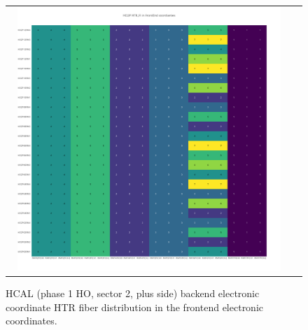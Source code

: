 \begin{figure}[htb]
 \begin{center}
  \begin{tabular}{cc}
   \includegraphics[angle=0,width=0.95\textwidth]{figures/appendix/HO2P_HTR_FI_in_FrontEnd.png}
  \end{tabular}
  \caption{HCAL (phase 1 HO, sector 2, plus side) backend electronic coordinate HTR fiber distribution in the frontend electronic coordinates.}
  \label{fig:lmapHO2PHTRFIFEC}
 \end{center}
\end{figure}
\clearpage

